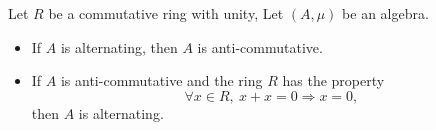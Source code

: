 \begin{proposition}
  Let $R$ be a commutative ring with unity,
  Let $(A, \mu)$ be an algebra.
  \begin{itemize}
    \item
      If $A$ is alternating, then $A$ is anti-commutative.
    \item
      If $A$ is anti-commutative and the ring $R$ has the property
      \begin{equation}
        \label{equation:ring/characteristics_is_not_divisible_by_2}
        \forall x \in R,\ x + x = 0 \Rightarrow x = 0,
      \end{equation}
      then $A$ is alternating.
  \end{itemize}
\end{proposition}
